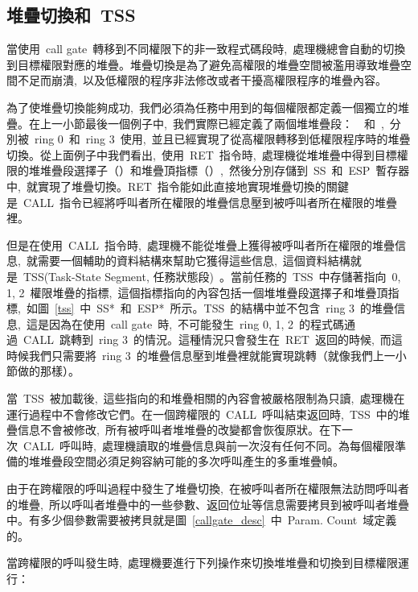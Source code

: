\subsection{堆疊切換和~TSS}

當使用~call gate~轉移到不同權限下的非一致程式碼段時,~處理機總會自動的切換到目標權限對應的堆疊。堆疊切換是為了避免高權限的堆疊空間被濫用導致堆疊空間不足而崩潰,~以及低權限的程序非法修改或者干擾高權限程序的堆疊內容。

為了使堆疊切換能夠成功,~我們必須為任務中用到的每個權限都定義一個獨立的堆疊。在上一小節最後一個例子中,~我們實際已經定義了兩個堆堆疊段：~~和~,~分別被~ring 0~和~ring 3~使用,~並且已經實現了從高權限轉移到低權限程序時的堆疊切換。從上面例子中我們看出,~使用~RET~指令時,~處理機從堆堆疊中得到目標權限的堆堆疊段選擇子（）和堆疊頂指標（）,~然後分別存儲到~SS~和~ESP~暫存器中,~就實現了堆疊切換。RET~指令能如此直接地實現堆疊切換的關鍵是~CALL~指令已經將呼叫者所在權限的堆疊信息壓到被呼叫者所在權限的堆疊裡。


但是在使用~CALL~指令時,~處理機不能從堆疊上獲得被呼叫者所在權限的堆疊信息,~就需要一個輔助的資料結構來幫助它獲得這些信息,~這個資料結構就是~TSS(Task-State Segment, 任務狀態段)~。當前任務的~TSS~中存儲著指向~0, 1, 2~權限堆疊的指標,~這個指標指向的內容包括一個堆堆疊段選擇子和堆疊頂指標,~如圖~\ref{tss}~中~SS*~和~ESP*~所示。TSS~的結構中並不包含~ring 3~的堆疊信息,~這是因為在使用~call gate~時,~不可能發生~ring 0, 1, 2~的程式碼通過~CALL~跳轉到~ring 3~的情況。這種情況只會發生在~RET~返回的時候,~而這時候我們只需要將~ring 3~的堆疊信息壓到堆疊裡就能實現跳轉（就像我們上一小節做的那樣）。

當~TSS~被加載後,~這些指向的和堆疊相關的內容會被嚴格限制為只讀,~處理機在運行過程中不會修改它們。在一個跨權限的~CALL~呼叫結束返回時,~TSS~中的堆疊信息不會被修改,~所有被呼叫者堆堆疊的改變都會恢復原狀。在下一次~CALL~呼叫時,~處理機讀取的堆疊信息與前一次沒有任何不同。為每個權限準備的堆堆疊段空間必須足夠容納可能的多次呼叫產生的多重堆疊幀。

由于在跨權限的呼叫過程中發生了堆疊切換,~在被呼叫者所在權限無法訪問呼叫者的堆疊,~所以呼叫者堆疊中的一些參數、返回位址等信息需要拷貝到被呼叫者堆疊中。有多少個參數需要被拷貝就是圖~\ref{callgate_desc}~中~Param. Count~域定義的。

當跨權限的呼叫發生時,~處理機要進行下列操作來切換堆堆疊和切換到目標權限運行：

